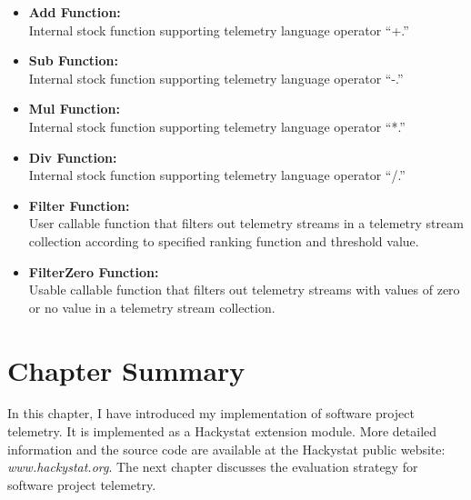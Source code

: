 \begin{itemize}  
	\item \textbf{Add Function:}\\
Internal stock function supporting telemetry language operator ``+.''
	
	\item \textbf{Sub Function:}\\
Internal stock function supporting telemetry language operator ``-.''

	\item \textbf{Mul Function:}\\
Internal stock function supporting telemetry language operator ``*.''
	
	\item \textbf{Div Function:}\\
Internal stock function supporting telemetry language operator ``/.''

	\item \textbf{Filter Function:}\\
User callable function that filters out telemetry streams in a telemetry stream collection according to specified ranking function and threshold value.

	\item \textbf{FilterZero Function:}\\
Usable callable function that filters out telemetry streams with values of zero or no value in a telemetry stream collection.

\end{itemize}





\section{Chapter Summary} \label{Implementation:Summary}

In this chapter, I have introduced my implementation of software project telemetry. It is implemented as a Hackystat extension module. More detailed information and the source code are available at the Hackystat public website: \textit{www.hackystat.org}. The next chapter discusses the evaluation strategy for software project telemetry.

